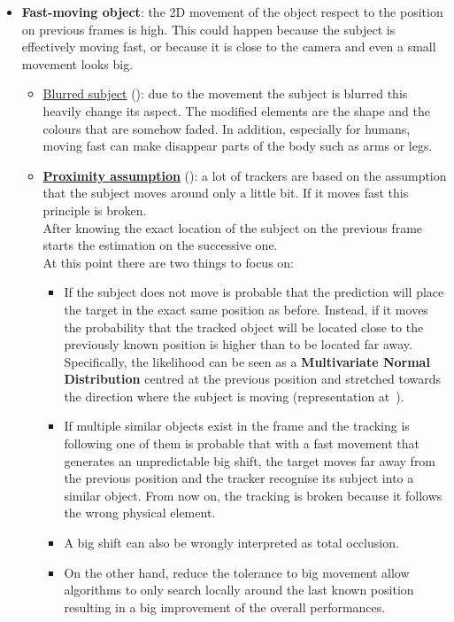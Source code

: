 \begin{itemize}
	\item \textbf{Fast-moving object}: the 2D movement of the object respect to the position on previous frames is high. This could happen because the subject is effectively moving fast, or because it is close to the camera and even a small movement looks big.
	\begin{itemize}
		\item \underline{Blurred subject} (): due to the movement the subject is blurred this heavily change its aspect. The modified elements are the shape and the colours that are somehow faded. In addition, especially for humans, moving fast can make disappear parts of the body such as arms or legs.
		\item \underline{\textbf{Proximity assumption}} (): a lot of trackers are based on the assumption that the subject moves around only a little bit. If it moves fast this principle is broken.\\
		After knowing the exact location of the subject on the previous frame starts the estimation on the successive one.\\
		At this point there are two things to focus on:
		\begin{itemize}[] %
			\item If the subject does not move is probable that the prediction will place the target in the exact same position as before. Instead, if it moves the probability that the tracked object will be located close to the previously known position is higher than to be located far away. Specifically, the likelihood can be seen as a \textbf{Multivariate Normal Distribution} centred at the previous position and stretched towards the direction where the subject is moving (representation at~).
			\item If multiple similar objects exist in the frame and the tracking is following one of them is probable that with a fast movement that generates an unpredictable big shift, the target moves far away from the previous position and the tracker recognise its subject into a similar object. From now on, the tracking is broken because it follows the wrong physical element.\\
			\item A big shift can also be wrongly interpreted as total occlusion.
			\item On the other hand, reduce the tolerance to big movement allow algorithms to only search locally around the last known position resulting in a big improvement of the overall performances.
		\end{itemize}		
	\end{itemize}


\end{itemize}
